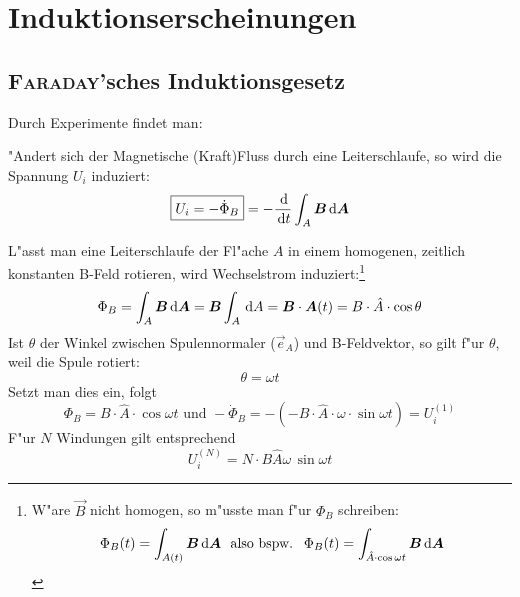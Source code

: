 \section{Induktionserscheinungen}
\label{kap_induktionserscheinungen}




\subsection{\textsc{Faraday}'sches Induktionsgesetz}
\label{kap_faradaysches-induktionsgesetz}

Durch Experimente findet man:
\begin{Wichtig}
"Andert sich der Magnetische (Kraft)Fluss durch eine Leiterschlaufe, so
wird die Spannung $U_i$ induziert:
\begin{equation}
   \label{eq:329}
   \boxed{U_i = - \dot \Phi_B} = - \frac{\, \mathrm{d} }{\, \mathrm{d} t} \int_A \boldsymbol{B}
   \, \mathrm{d} \boldsymbol{A}
\end{equation}
\end{Wichtig}



\begin{Beispiel}
L"asst man eine Leiterschlaufe der Fl"ache $A$ in einem homogenen,
zeitlich konstanten B-Feld rotieren, wird Wechselstrom
induziert:\footnote{W"are $\vec B$ nicht homogen, so m"usste man f"ur
  $\Phi_B$ schreiben:
$$
\Phi_B(t) = \int_{A(t)} \boldsymbol{B} \, \mathrm{d} \boldsymbol{A} ~ \text{ also bspw. } ~
\Phi_B(t) = \int_{\hat A \cdot \cos \omega t} \boldsymbol{B} \, \mathrm{d} \boldsymbol{A} 
$$}
\begin{equation*}
   \label{eq:330}
   \Phi_B = \int_A \boldsymbol{B} \, \mathrm{d} \boldsymbol{A} = \boldsymbol{B} \int_A \, \mathrm{d} A = \boldsymbol{B} \cdot \boldsymbol{A}(t) = B \cdot \hat A \cdot \cos \theta
\end{equation*}
Ist $\theta$ der Winkel zwischen Spulennormaler ($\vec e_A$) und
B-Feldvektor, so gilt f"ur $\theta$, weil die Spule rotiert:
\begin{equation*}
   \theta = \omega t
\end{equation*}
Setzt man dies ein, folgt
\begin{equation*}
   \Phi_B = B \cdot \hat A \cdot \cos \omega t \text{ und } - \dot
   \Phi_B = - \left ( - B \cdot \hat A \cdot \omega \cdot \sin \omega t \right ) =U_i^{(1)}
\end{equation*}
F"ur $N$ Windungen gilt entsprechend
\begin{equation*}
   U_i^{(N)} = N \cdot B \hat A \omega \, \sin \omega t
\end{equation*}

\end{Beispiel}


